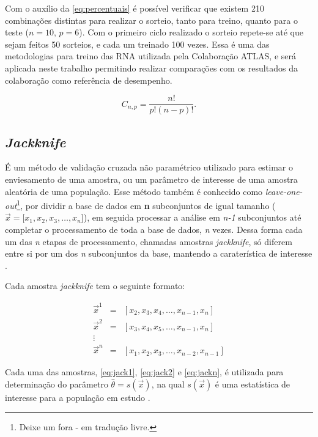 Com o auxílio da \autoref{eq:percentuais} é possível verificar que existem 210 combinações distintas para realizar o sorteio, tanto para treino, quanto para o teste ($n=10,\, p=6$). Com o primeiro ciclo realizado o sorteio repete-se até que sejam feitos 50 sorteios, e cada um treinado 100 vezes. Essa é uma das metodologias para treino das RNA utilizada pela Colaboração ATLAS, e será aplicada neste trabalho permitindo realizar comparações com os resultados da colaboração como referência de desempenho.

\begin{equation}
   C_{n,p} = \frac{n!}{p!(n-p)!}. \label{eq:percentuais}
\end{equation}

\subsection{\textit{Jackknife}}

É um método de validação cruzada não paramétrico utilizado para estimar o enviesamento de uma amostra, ou um parâmetro de interesse de uma amostra aleatória de uma população. Esse método também é conhecido como \textit{leave-one-out}\footnote{Deixe um fora - em tradução livre.}, por dividir a base de dados em \textbf{n} subconjuntos de igual tamanho ($\vec{x} = [x_1,x_2,x_3,\dots , x_n$]), em seguida processar a análise em \textit{n-1} subconjuntos até completar o processamento de toda a base de dados, \textit{n} vezes. Dessa forma cada um das \textit{n} etapas de processamento, chamadas amostras  \textit{jackknife}, só diferem entre si por um dos \textit{n} subconjuntos da base, mantendo a caraterística de interesse \cite{thesis:giovani2006,abdi2010}.

Cada amostra \textit{jackknife} tem o seguinte formato:

\begin{eqnarray}
	\vec{x}^1 &=& [x_2,x_3,x_4,\ldots , x_{n-1},x_n] \label{eq:jack1}	\\
	\vec{x}^2 &=& [x_3,x_4,x_5,\ldots , x_{n-1},x_n] \label{eq:jack2} \\
	\vdots  \nonumber \\
	\vec{x}^n &=& [x_1,x_2,x_3,\ldots , x_{n-2},x_{n-1}]\label{eq:jackn} 
\end{eqnarray}

Cada uma das amostras, \autoref{eq:jack1}, \autoref{eq:jack2} e \autoref{eq:jackn}, é utilizada para determinação do parâmetro $\hat{\theta}=s(\vec{x})$, na qual $s(\vec{x})$ é uma estatística de interesse para a população em estudo \cite{me:edmar2013}.

